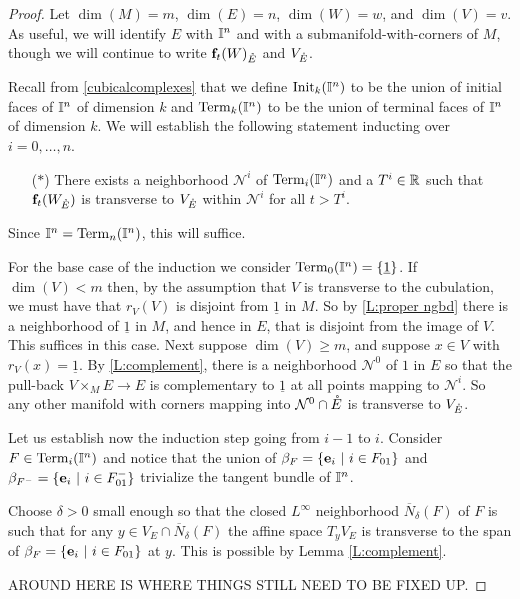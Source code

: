 \begin{proof}
	Let $\dim(M) = m$, $\dim(E) = n$, $\dim(W) = w$, and $\dim(V) = v$.
	As useful, we will identify $E$ with $\mathbb{I}^n$ and with a submanifold-with-corners of $M$, though we will continue to write $\mathbf{f}_t(W)_{\mathring{E}}$ and $V_{\mathring{E}}$.

	Recall from \cref{cubicalcomplexes} that we define ${\rm Init}_k(\mathbb{I}^n)$ to be the union of initial faces of $\mathbb{I}^n$ of dimension $k$ and ${\rm Term}_k(\mathbb{I}^n)$ to be the union of terminal faces of $\mathbb{I}^n$ of dimension $k$.
	We will establish the following statement inducting over $i = 0, \dots, n$.
	\begin{itemize}
		\item[($\ast$)] There exists a neighborhood $\mathcal N^i$ of ${\rm Term}_{i}(\mathbb{I}^n)$ and a $T^i \in \mathbb{R}$ such that $\mathbf{f}_t(W_{\mathring{E}})$ is transverse to $V_{\mathring{E}}$ within $\mathcal N^i$ for all $t > T^i$.
	\end{itemize}
	Since $\mathbb{I}^n = {\rm Term}_{n}(\mathbb{I}^n)$, this will suffice.

	For the base case of the induction we consider ${\rm Term}_0(\mathbb{I}^n) = \{\underline{1}\}$.
	If $\dim(V) < m$ then, by the assumption that $V$ is transverse to the cubulation, we must have that $r_V(V)$ is disjoint from $\underline{1}$ in $M$.
	So by \cref{L:proper ngbd} there is a neighborhood of $\underline{1}$ in $M$, and hence in $E$, that is disjoint from the image of $V$.
	This suffices in this case.
	Next suppose $\dim(V) \geq m$, and suppose $x \in V$ with $r_V(x) = \underline{1}$.
	By \cref{L:complement}, there is a neighborhood $\mathcal N^0$ of $1$ in $E$ so that the pull-back $V \times_M E \to E$ is complementary to $\underline{1}$ at all points mapping to $\mathcal N^i$.
	So any other manifold with corners mapping into $\mathcal N^0 \cap \mathring{E}$ is transverse to $V_{\mathring{E}}$.

	Let us establish now the induction step going from $i-1$ to $i$.
	Consider $F \in {\rm Term}_{i}(\mathbb{I}^n)$ and notice that the union of $\beta_F = \{\mathbf{e}_i\ |\ i \in F_{01}\}$ and $\beta_{F^-} = \{\mathbf{e}_i\ |\ i \in F^-_{01}\}$ trivialize the tangent bundle of $\mathbb{I}^n$.

	Choose $\delta > 0$ small enough so that the closed $L^\infty$ neighborhood $\overline N_\delta(F)$ of $F$ is such that for any $y \in V_E \cap \overline N_\delta(F)$ the affine space $T_yV_E$ is transverse to the span of $\beta_F = \{\mathbf{e}_i\ |\ i \in F_{01}\}$ at $y$.
	This is possible by Lemma \ref{L:complement}.

	AROUND HERE IS WHERE THINGS STILL NEED TO BE FIXED UP.


\end{proof}
